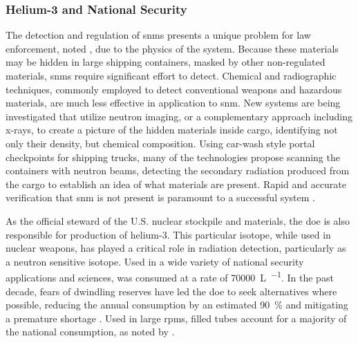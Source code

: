 \documentclass[../../../main.tex]{subfiles}%
\begin{document}
%
    \subsubsection{Helium-3 and National Security}%
    \label{sec:chapter-1:motivation:helium-3-and-security}%
    The detection and regulation of \glspl{snm} presents a unique problem for law enforcement, noted \citeauthor*{book:Anderson_2009}, due to the physics of the system.
    Because these materials may be hidden in large shipping containers, masked by other non-regulated materials, \glspl{snm} require significant effort to detect.
    Chemical and radiographic techniques, commonly employed to detect conventional weapons and hazardous materials, are much less effective in application to \gls{snm}.
    New systems are being investigated that utilize neutron imaging, or a complementary approach including \glspl{x-ray}, to create a picture of the hidden materials inside cargo, identifying not only their density, but chemical composition.
    Using car-wash style portal checkpoints for shipping trucks, many of the technologies propose scanning the containers with neutron beams, detecting the secondary radiation produced from the cargo to establish an idea of what materials are present.
    Rapid and accurate verification that \gls{snm} is not present is paramount to a successful system \cite{book:Anderson_2009}.    
    \par%
    As the official steward of the U.S. nuclear stockpile and materials, the \gls{doe} is also responsible for production of helium-3.
    This particular isotope, while used in nuclear weapons, has played a critical role in radiation detection, particularly as a neutron sensitive isotope.
    Used in a wide variety of national security applications and sciences,  was consumed at a rate of \SI[per-mode={symbol}]{70000}{\liter\per\year}.    
    In the past decade, fears of dwindling  reserves have led the \gls{doe} to seek alternatives where possible, reducing the annual consumption by an estimated \SI{90}{\percent} and mitigating a premature shortage \cite{website:DOE:helium3}.
    Used in large \glspl{rpm},  filled tubes account for a majority of the national consumption, as noted by \citeauthor*{Kouzes_2015}.
\end{document}

